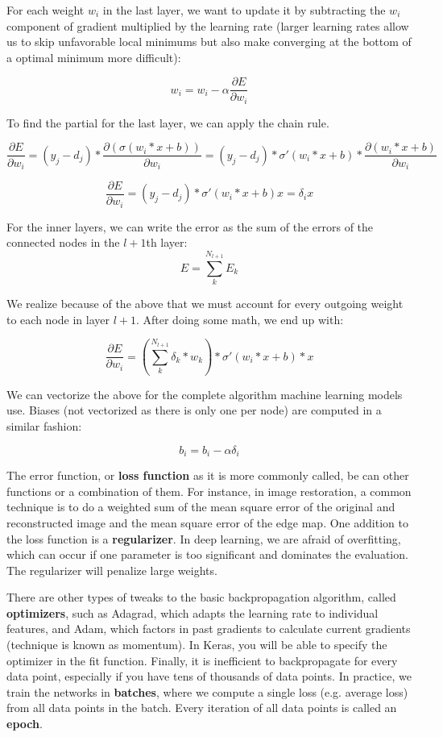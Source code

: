 \documentclass{article}
\begin{document}
For each weight $w_i$ in the last layer, we want to update it by subtracting the $w_i$ component of gradient multiplied by the learning rate (larger learning rates allow us to skip unfavorable local minimums but also make converging at the bottom of a optimal minimum more difficult):

$$ w_i = w_i - \alpha\frac{\partial E}{\partial w_i} $$

To find the partial for the last layer, we can apply the chain rule.  

$$ \frac{\partial E}{\partial w_i} = (y_j-d_j)*\frac{\partial (\sigma(w_i*x+b))}{\partial w_i} = (y_j-d_j)*\sigma'(w_i*x+b)*\frac{\partial (w_i*x+b)}{\partial w_i}$$

$$ \frac{\partial E}{\partial w_i} = (y_j-d_j)*\sigma'(w_i*x+b)x = \delta_ix$$

For the inner layers, we can write the error as the sum of the errors of the connected nodes in the $l+1$th layer:
$$ E = \sum_{k}^{N_{l+1}}E_k$$

We realize because of the above that we must account for every outgoing weight to each node in layer $l+1$. After doing some math, we end up with:

$$  \frac{\partial E}{\partial w_i} = (\sum_{k}^{N_{l+1}}\delta_k*w_k)*\sigma'(w_i*x+b)*x$$

We can vectorize the above for the complete algorithm machine learning models use. Biases (not vectorized as there is only one per node) are computed in a similar fashion:

$$b_i = b_i - \alpha\delta_i$$

The error function, or \textbf{loss function} as it is more commonly called, be can other functions or a combination of them. For instance, in image restoration, a common technique is to do a weighted sum of the mean square error of the original and reconstructed image and the mean square error of the edge map. One addition to the loss function is a \textbf{regularizer}. In deep learning, we are afraid of overfitting, which can occur if one parameter is too significant and dominates the evaluation. The regularizer will penalize large weights. 

There are other types of tweaks to the basic backpropagation algorithm, called \textbf{optimizers}, such as Adagrad, which adapts the learning rate to individual features, and Adam, which factors in past gradients to calculate current gradients (technique is known as momentum). In Keras, you will be able to specify the optimizer in the fit function. Finally, it is inefficient to backpropagate for every data point, especially if you have tens of thousands of data points. In practice, we train the networks in \textbf{batches}, where we compute a single loss (e.g. average loss) from all data points in the batch. Every iteration of all data points is called an \textbf{epoch}.
\end{document}

